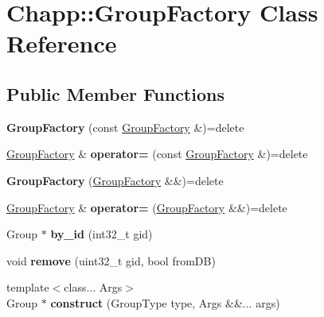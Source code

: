 \hypertarget{class_chapp_1_1_group_factory}{}\section{Chapp\+:\+:Group\+Factory Class Reference}
\label{class_chapp_1_1_group_factory}
\subsection*{Public Member Functions}
\begin{DoxyCompactItemize}
\item 
\mbox{\label{class_chapp_1_1_group_factory_a08c36d6f3321beb610f526bc47877915}} 
{\bfseries Group\+Factory} (const \hyperlink{class_chapp_1_1_group_factory}{Group\+Factory} \&)=delete
\item 
\mbox{\label{class_chapp_1_1_group_factory_abc95ba626855967aa55505d91246f0af}} 
\hyperlink{class_chapp_1_1_group_factory}{Group\+Factory} \& {\bfseries operator=} (const \hyperlink{class_chapp_1_1_group_factory}{Group\+Factory} \&)=delete
\item 
\mbox{\label{class_chapp_1_1_group_factory_aa3ca7ea25201bf0b8e508a59db576606}} 
{\bfseries Group\+Factory} (\hyperlink{class_chapp_1_1_group_factory}{Group\+Factory} \&\&)=delete
\item 
\mbox{\label{class_chapp_1_1_group_factory_ab379f425f360561dd8ae215738b0b0ed}} 
\hyperlink{class_chapp_1_1_group_factory}{Group\+Factory} \& {\bfseries operator=} (\hyperlink{class_chapp_1_1_group_factory}{Group\+Factory} \&\&)=delete
\item 
\mbox{\label{class_chapp_1_1_group_factory_abdb6edfdecb02c9b2abefcea22716895}} 
Group $\ast$ {\bfseries by\+\_\+id} (int32\+\_\+t gid)
\item 
\mbox{\label{class_chapp_1_1_group_factory_aa4024fdee71c706a7b34ce31de0ae71e}} 
void {\bfseries remove} (uint32\+\_\+t gid, bool from\+DB)
\item 
\mbox{\label{class_chapp_1_1_group_factory_a47c92da29438e7b303ab490380a52431}} 
{\footnotesize template$<$class... Args$>$ }\\Group $\ast$ {\bfseries construct} (Group\+Type type, Args \&\&... args)
\end{DoxyCompactItemize}
